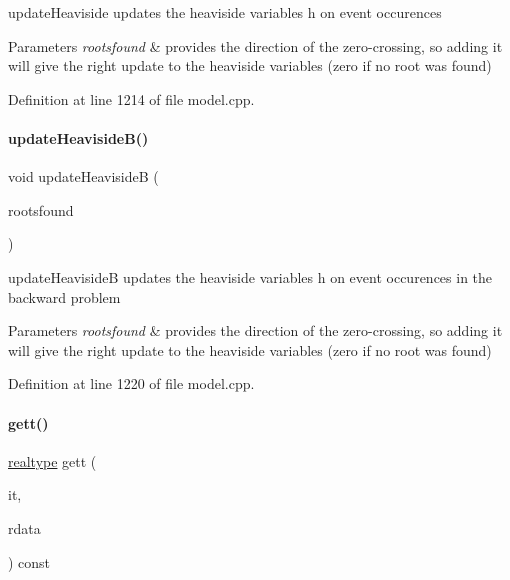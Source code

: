 update\+Heaviside updates the heaviside variables h on event occurences


\begin{DoxyParams}{Parameters}
{\em rootsfound} & provides the direction of the zero-\/crossing, so adding it will give the right update to the heaviside variables (zero if no root was found) \\
\hline
\end{DoxyParams}


Definition at line 1214 of file model.\+cpp.

\mbox{\label{classamici_1_1_model_a430edd546832d0abbea6472eb7e43da8}} 
\paragraph{\texorpdfstring{update\+Heaviside\+B()}{updateHeavisideB()}}
{\footnotesize\ttfamily void update\+HeavisideB (\begin{DoxyParamCaption}\item[{const int $\ast$}]{rootsfound }\end{DoxyParamCaption})}

update\+HeavisideB updates the heaviside variables h on event occurences in the backward problem


\begin{DoxyParams}{Parameters}
{\em rootsfound} & provides the direction of the zero-\/crossing, so adding it will give the right update to the heaviside variables (zero if no root was found) \\
\hline
\end{DoxyParams}


Definition at line 1220 of file model.\+cpp.

\mbox{\label{classamici_1_1_model_a09e0a747a99fb59657e71690ce69726b}} 
\paragraph{\texorpdfstring{gett()}{gett()}}
{\footnotesize\ttfamily \mbox{\hyperlink{namespaceamici_a1bdce28051d6a53868f7ccbf5f2c14a3}{realtype}} gett (\begin{DoxyParamCaption}\item[{const int}]{it,  }\item[{const \mbox{\hyperlink{classamici_1_1_return_data}{Return\+Data}} $\ast$}]{rdata }\end{DoxyParamCaption}) const}

